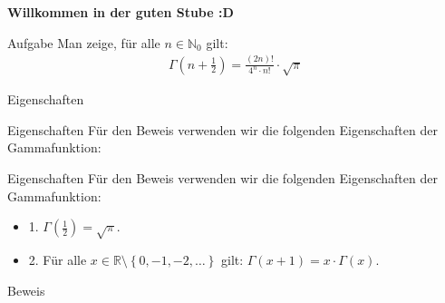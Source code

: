 \documentclass[10pt]{beamer}
\title{}
\author{Artur's \( \oint \) Mathematikstübchen}
\date{}
\def\bN{\mathbb{N}}
\def\bR{\mathbb{R}}
\begin{document}

\begin{frame}
    \begin{center}
        \textbf{\huge Willkommen in der guten Stube \newline \newline :D}
    \end{center}
\end{frame}




\begin{frame}
    \begin{alertblock}{Aufgabe}
        Man zeige, für alle \( n \in \bN_{0} \) gilt:
        \begin{align*}
            \Gamma\left( n + \frac{1}{2} \right)
            = \frac{\left( 2n \right)!}{4^{n} \cdot n!} \cdot \sqrt{\pi}
        \end{align*}
    \end{alertblock}
\end{frame}



\begin{frame}{Eigenschaften}
    
\end{frame}



\begin{frame}{Eigenschaften}
    Für den Beweis verwenden wir die folgenden Eigenschaften der Gammafunktion:
\end{frame}



\begin{frame}{Eigenschaften}
    Für den Beweis verwenden wir die folgenden Eigenschaften der Gammafunktion:
    \begin{itemize}
        \item<1-> 1. \( \Gamma\left( \frac{1}{2} \right) = \sqrt{\pi} \).
        \item<2->  2. Für alle \( x \in \bR \setminus \left\{ 0, -1, -2, \ldots \right\} \) gilt: \( \Gamma\left( x + 1 \right) = x \cdot \Gamma\left( x \right) \).
    \end{itemize}
\end{frame}



\begin{frame}{Beweis}
 
\end{frame}
\end{document}
